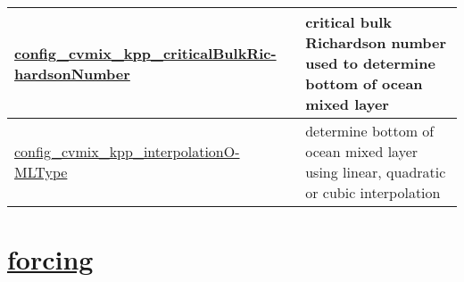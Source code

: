 {\begin{center}
\begin{longtable}{| p{2.0in} || p{4.0in} |}
	\hline
	\hyperref[subsec:nm_sec_config_cvmix_kpp_criticalBulkRichardsonNumber]{config\_cvmix\_kpp\_criticalBulkRic-}\hyperref[subsec:nm_sec_config_cvmix_kpp_criticalBulkRichardsonNumber]{hardsonNumber}& critical bulk Richardson number used to determine bottom of ocean mixed layer \\
	\hline
	\hyperref[subsec:nm_sec_config_cvmix_kpp_interpolationOMLType]{config\_cvmix\_kpp\_interpolationO-}\hyperref[subsec:nm_sec_config_cvmix_kpp_interpolationOMLType]{MLType}& determine bottom of ocean mixed layer using linear, quadratic or cubic interpolation \\
	\hline
\end{longtable}
\end{center}
}
\section[forcing]{\hyperref[sec:nm_sec_forcing]{forcing}}
\label{sec:nm_tab_forcing}

\vspace{0.5in}
